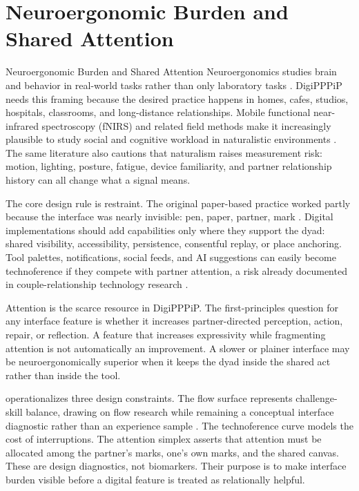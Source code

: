 \documentclass[
  ignorenonframetext,
]{beamer}
\author{\texorpdfstring{}{}}
\date{}
\begin{document}
\section{Neuroergonomic Burden and Shared
Attention}\label{sec:neuroergonomics}

\begin{frame}{Neuroergonomic Burden and Shared
Attention}
Neuroergonomics studies brain and behavior in real-world tasks rather
than only laboratory tasks . DigiPPPiP
needs this framing because the desired practice happens in homes, cafes,
studios, hospitals, classrooms, and long-distance relationships. Mobile
functional near-infrared spectroscopy (fNIRS) and related field methods
make it increasingly plausible to study social and cognitive workload in
naturalistic environments . The same literature also cautions that
naturalism raises measurement risk: motion, lighting, posture, fatigue,
device familiarity, and partner relationship history can all change what
a signal means.

The core design rule is restraint. The original paper-based practice
worked partly because the interface was nearly invisible: pen, paper,
partner, mark . Digital implementations should
add capabilities only where they support the dyad: shared visibility,
accessibility, persistence, consentful replay, or place anchoring. Tool
palettes, notifications, social feeds, and AI suggestions can easily
become technoference if they compete with partner attention, a risk
already documented in couple-relationship technology research
.

Attention is the scarce resource in DigiPPPiP. The first-principles
question for any interface feature is whether it increases
partner-directed perception, action, repair, or reflection. A feature
that increases expressivity while fragmenting attention is not
automatically an improvement. A slower or plainer interface may be
neuroergonomically superior when it keeps the dyad inside the shared act
rather than inside the tool.

 operationalizes three design
constraints. The flow surface represents challenge-skill balance,
drawing on flow research while remaining a conceptual interface
diagnostic rather than an experience sample
. The technoference curve models the cost
of interruptions. The attention simplex asserts that attention must be
allocated among the partner's marks, one's own marks, and the shared
canvas. These are design diagnostics, not biomarkers. Their purpose is
to make interface burden visible before a digital feature is treated as
relationally helpful.


\end{frame}
\end{document}
